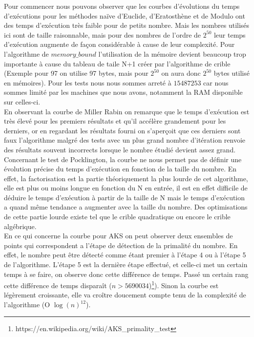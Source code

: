 	Pour commencer nous pouvons observer que les courbes d'évolutions du temps d'exécutions pour les méthodes naïve d'Euclide, d'Eratosthène et de Modulo ont des temps d'exécution très faible pour de petits nombre. Mais les nombres utilisés ici sont de taille raisonnable, mais pour des nombres de l'ordre de $2^{50}$ leur temps d'exécution augmente de façon considérable à cause de leur complexité. Pour l'algorithme de $memory\_bound$ l'utilisation de la mémoire devient beaucoup trop importante à cause du tableau de taile N+1 créer par l'algorithme de crible (Exemple pour 97 on utilise 97 bytes, mais pour $2^{50}$ on aura donc $2^{50}$ bytes utilisé en mémoires). Pour les tests nous nous sommes arreté à $15487253$ car nous sommes limité par les machines que nous avons, notamment la RAM disponible sur celles-ci.\\	
	
	En observant la courbe de Miller Rabin on remarque que le temps d'exécution est très élevé pour les premiers résultats et qu'il accélère grandement pour les derniers, or en regardant les résultats fourni on s'aperçoit que ces derniers sont faux l'algorithme malgré des tests avec un plus grand nombre d'itération renvoie des résultats souvent incorrects lorsque le nombre étudié devient assez grand.\\		
		
		Concernant le test de Pocklington, la courbe ne nous permet pas de définir une évolution précise du temps d'exécution en fonction de la taille du nombre. En effet, la factorisation est la partie théoriquement la plus lourde de cet algorithme, elle est plus ou moins longue en fonction du N en entrée, il est en effet difficile de déduire le temps d’exécution à partir de la taille de N mais le temps d'exécution a quand même tendance a augmenter avec la taille du nombre. Des optimisations de cette partie lourde existe tel que le crible quadratique ou encore le crible algébrique.\\		
		
		En ce qui concerne la courbe pour AKS on peut observer deux ensembles de points qui correspondent a l'étape de détection de la primalité du nombre. En effet, le nombre peut être  détecté comme étant premier à l'étape 4 ou à l'étape 5 de l'algorithme. L'étape 5 est la dernière étape effectué, et celle-ci met un certain temps à se faire, on observe donc cette différence de temps. Passé un certain rang cette différence de temps disparaît ($n > 5690034$)\footnote{https://en.wikipedia.org/wiki/AKS\_primality\_test}).
Sinon la courbe est légèrement croissante, elle va croître doucement compte tenu de la complexité de l’algorithme (O $\log(n)^{12}$).\\

